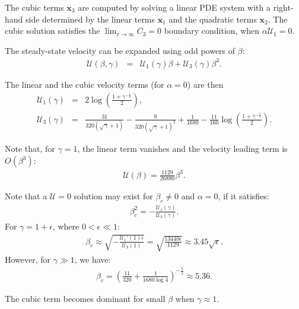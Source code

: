 \documentclass[10pt]{ijnam}
\newcommand\eps \epsilon
\newcommand{\pars}[1]{\left(#1\right)}
\newcommand\bx{\boldsymbol{x}}
\newcommand\cU{\mathscr{U}}
\begin{document}
The cubic terms $\bx_3$ are computed by solving a linear PDE system 
with a right-hand side determined by the linear terms $\bx_1$ and the quadratic terms $\bx_2$.
The cubic solution satisfies the $\lim_{r\rightarrow\infty}C_3 = 0$ boundary condition, 
when $\alpha\cU_1 = 0$.

The steady-state velocity can be expanded using odd powers of $\beta$:
\begin{eqnarray*}
\cU(\beta, \gamma) &=& \cU_1(\gamma) \beta + \cU_3(\gamma) \beta^3.
\end{eqnarray*}

The linear and the cubic velocity terms (for $\alpha = 0$) are then
\begin{eqnarray*}
\cU_1(\gamma) &=& 2 \log \pars{\frac{1 + \gamma^{-\frac{1}{2}}}{2}}, \\
\cU_3(\gamma) &=& \frac{31}{320(\sqrt\gamma + 1)} - \frac{9}{320(\sqrt\gamma + 1)^2} + \frac{1}{1680} - \frac{11}{160} \log \pars{\frac{1 + \gamma^{-\frac{1}{2}}}{2}}.
\end{eqnarray*}

Note that, for $\gamma = 1$, the linear term vanishes and the velocity leading term is $O(\beta^3)$:
\begin{eqnarray*}
\cU(\beta) = \frac{1129}{26880}\beta^3.
\end{eqnarray*}

Note that a $\cU = 0$ solution may exist for $\beta_c \ne 0$ and $\alpha = 0$, 
if it satisfies:
\begin{eqnarray*}
\beta_c^2 = -\frac{\cU_1(\gamma)}{\cU_3(\gamma)}.
\end{eqnarray*}
For $\gamma = 1 + \eps$, where $0 < \eps \ll 1$:
\begin{eqnarray*}
\beta_c \approx \sqrt{-\frac{\cU_1'(1) \eps}{\cU_3(1)}} = 
 \sqrt{\frac{13440 \eps}{1129}} \approx 3.45 \sqrt{\eps}.
\end{eqnarray*}
However, for $\gamma \gg 1$, we have:
\begin{eqnarray*}
\beta_c =  \pars{\frac{11}{320} + \frac{1}{1680 \log 4}}^{-\frac{1}{2}} \approx 5.36.
\end{eqnarray*}

The cubic term becomes dominant for small $\beta$ when $\gamma \approx 1$.

\end{document}
